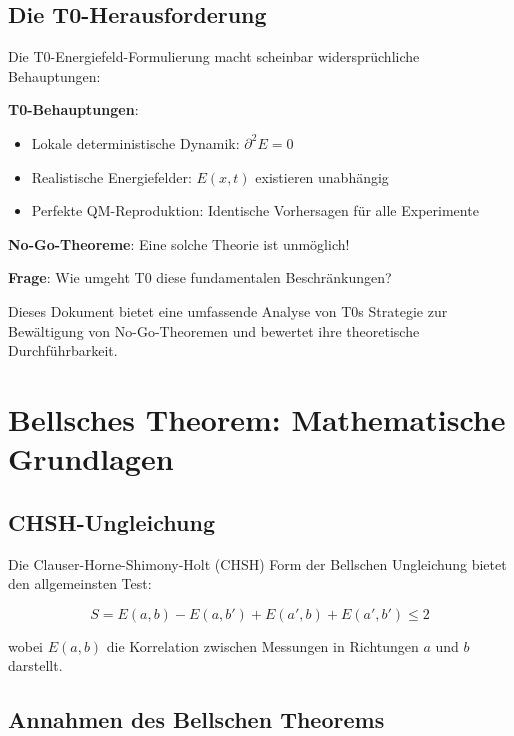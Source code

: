 \documentclass[12pt,a4paper]{article}
\newcommand{\Efield}{E}
\begin{document}
	\subsection{Die T0-Herausforderung}
	
	Die T0-Energiefeld-Formulierung macht scheinbar widersprüchliche Behauptungen:
	
	\begin{tcolorbox}[colback=red!5!white,colframe=red!75!black,title=T0-Behauptungen vs No-Go-Theoreme]
		\textbf{T0-Behauptungen}:
		\begin{itemize}
			\item Lokale deterministische Dynamik: $\partial^2 \Efield = 0$
			\item Realistische Energiefelder: $\Efield(x,t)$ existieren unabhängig
			\item Perfekte QM-Reproduktion: Identische Vorhersagen für alle Experimente
		\end{itemize}
		
		\textbf{No-Go-Theoreme}: Eine solche Theorie ist unmöglich!
		
		\textbf{Frage}: Wie umgeht T0 diese fundamentalen Beschränkungen?
	\end{tcolorbox}
	
	Dieses Dokument bietet eine umfassende Analyse von T0s Strategie zur Bewältigung von No-Go-Theoremen und bewertet ihre theoretische Durchführbarkeit.
	
	\section{Bellsches Theorem: Mathematische Grundlagen}
	
	\subsection{CHSH-Ungleichung}
	
	Die Clauser-Horne-Shimony-Holt (CHSH) Form der Bellschen Ungleichung bietet den allgemeinsten Test:
	
	\begin{equation}
		S = E(a,b) - E(a,b') + E(a',b) + E(a',b') \leq 2
		\label{eq:chsh_inequality}
	\end{equation}
	
	wobei $E(a,b)$ die Korrelation zwischen Messungen in Richtungen $a$ und $b$ darstellt.
	
	\subsection{Annahmen des Bellschen Theorems}
	
\end{document}
